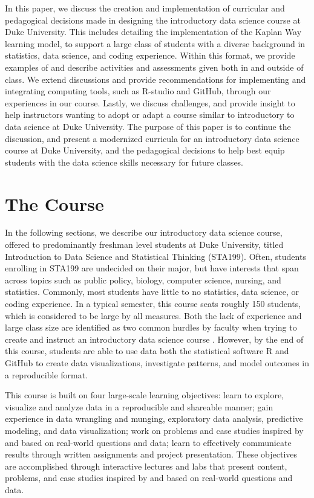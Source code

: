 \documentclass[
  12pt]{article}
\begin{document}
In this paper, we discuss the creation and implementation of curricular
and pedagogical decisions made in designing the introductory data
science course at Duke University. This includes detailing the
implementation of the Kaplan Way learning model, to support a large
class of students with a diverse background in statistics, data science,
and coding experience. Within this format, we provide examples of and
describe activities and assessments given both in and outside of class.
We extend discussions and provide recommendations for implementing and
integrating computing tools, such as R-studio and GitHub, through our
experiences in our course. Lastly, we discuss challenges, and provide
insight to help instructors wanting to adopt or adapt a course similar
to introductory to data science at Duke University. The purpose of this
paper is to continue the discussion, and present a modernized curricula
for an introductory data science course at Duke University, and the
pedagogical decisions to help best equip students with the data science
skills necessary for future classes.

\hypertarget{sec-course}{%
\section{The Course}\label{sec-course}}

In the following sections, we describe our introductory data science
course, offered to predominantly freshman level students at Duke
University, titled Introduction to Data Science and Statistical Thinking
(STA199). Often, students enrolling in STA199 are undecided on their
major, but have interests that span across topics such as public policy,
biology, computer science, nursing, and statistics. Commonly, most
students have little to no statistics, data science, or coding
experience. In a typical semester, this course seats roughly 150
students, which is considered to be large by all measures. Both the lack
of experience and large class size are identified as two common hurdles
by faculty when trying to create and instruct an introductory data
science course \citep{Schwab2020, Kok_2008}. However, by the end of this
course, students are able to use data both the statistical software R
and GitHub to create data visualizations, investigate patterns, and
model outcomes in a reproducible format.

This course is built on four large-scale learning objectives: learn to
explore, visualize and analyze data in a reproducible and shareable
manner; gain experience in data wrangling and munging, exploratory data
analysis, predictive modeling, and data visualization; work on problems
and case studies inspired by and based on real-world questions and data;
learn to effectively communicate results through written assignments and
project presentation. These objectives are accomplished through
interactive lectures and labs that present content, problems, and case
studies inspired by and based on real-world questions and data.
\end{document}
